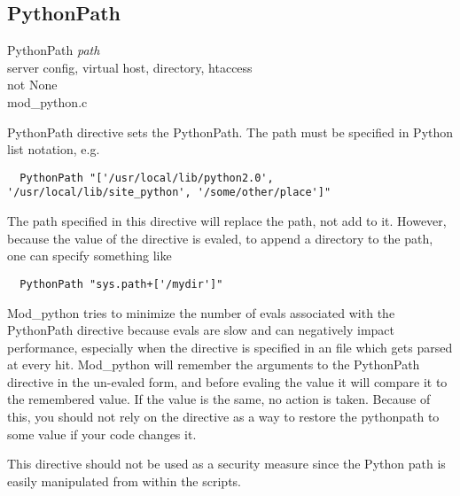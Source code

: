 \subsection{PythonPath\label{dir-other-pp}}

PythonPath \emph{path} \\
server config, virtual host, directory, htaccess\\
not None\\
mod_python.c

PythonPath directive sets the PythonPath. The path must be specified
in Python list notation, e.g.

\begin{verbatim}
  PythonPath "['/usr/local/lib/python2.0', '/usr/local/lib/site_python', '/some/other/place']"
\end{verbatim}

The path specified in this directive will replace the path, not add to
it. However, because the value of the directive is evaled, to append a
directory to the path, one can specify something like

\begin{verbatim}
  PythonPath "sys.path+['/mydir']"
\end{verbatim}

Mod_python tries to minimize the number of evals associated with the
PythonPath directive because evals are slow and can negatively impact
performance, especially when the directive is specified in an
 file which gets parsed at every hit. Mod_python will
remember the arguments to the PythonPath directive in the un-evaled
form, and before evaling the value it will compare it to the
remembered value. If the value is the same, no action is
taken. Because of this, you should not rely on the directive as a way
to restore the pythonpath to some value if your code changes it.

\begin{notice}
  This directive should not be used as a security measure since the
  Python path is easily manipulated from within the scripts.
\end{notice}
